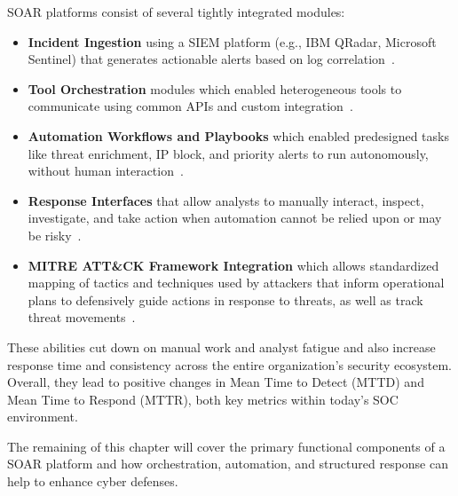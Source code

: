 SOAR platforms consist of several tightly integrated modules: 
\begin{itemize}[noitemsep,topsep=0pt]
    \item \textbf{Incident Ingestion} using a SIEM platform (e.g., IBM QRadar, Microsoft Sentinel) that generates actionable alerts based on log correlation~\cite{microsoftsiem}.
    \item \textbf{Tool Orchestration} modules which enabled heterogeneous tools to communicate using common APIs and custom integration~\cite{techtarget}.
    \item \textbf{Automation Workflows and Playbooks} which enabled predesigned tasks like threat enrichment, IP block, and priority alerts to run autonomously, without human interaction~\cite{paloalto}.
    \item \textbf{Response Interfaces} that allow analysts to manually interact, inspect, investigate, and take action when automation cannot be relied upon or may be risky~\cite{techtarget}.
    \item \textbf{MITRE ATT\&CK Framework Integration} which allows standardized mapping of tactics and techniques used by attackers that inform operational plans to defensively guide actions in response to threats, as well as track threat movements~\cite{mitre}.
\end{itemize}

These abilities cut down on manual work and analyst fatigue and also increase response time and consistency across the entire organization’s security ecosystem. Overall, they lead to positive changes in Mean Time to Detect (MTTD) and Mean Time to Respond (MTTR), both key metrics within today’s SOC environment.

The remaining of this chapter will cover the primary functional components of a SOAR platform and how orchestration, automation, and structured response can help to enhance cyber defenses.